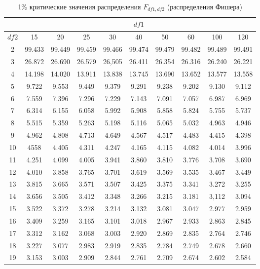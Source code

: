 \documentclass[12pt]{article}
\begin{document}
\begin{table}
\caption{1\% критические значения распределения $F_{df1,df2}$
(распределения Фишера) }
\begin{center}
{\footnotesize
\begin{tabular}{|c|c|c|c|c|c|c|c|c|c|}
	\hline
	& \multicolumn{9}{|c|}{$df1$} \\ \hline
	$df2$ & 15 & 20 & 25 & 30 & 40&  50&  60 & 100& 120\\ \hline  \hline
	2 & 99.433&99.449&99.459&99.466&99.474&99.479&99.482&99.489&99.491\\
	3 & 26.872&26.690&26.579&26,505&26.411&26.354&26.316&26.240&26.221\\
	4 & 14.198&14.020&13.911&13.838&13.745 &13.690&13.652&13.577&13.558\\
	5 & 9.722&9.553&9.449&9.379 &9.291 &9.238 &9.202&9.130&9.112\\
	6 & 7.559 &7.396&7.296&7.229&7.143&7.091&7.057&6.987&6.969\\
	7 & 6.314 &6.155&6.058&5.992&5.908&5.858&5.824&5.755&5.737\\
	8 & 5.515 &5.359&5.263&5.198&5.116&5.065&5.032&4.963&4.946\\
	9 & 4.962 &4.808&4.713&4.649&4.567&4.517&4.483&4.415&4.398\\
	10 & 4558 &4.405&4.311&4.247&4.165&4.115&4.082&4.014&3.996\\
	11 & 4.251 &4.099 &4.005 &3.941 &3.860 &3.810 &3.776 &3.708 &3.690\\
	12 & 4.010 &3.858 &3.765 &3.701 &3.619 &3.569 &3.535 &3.467 &3.449\\
	13 & 3.815 &3.665 &3.571 &3.507 &3.425 &3.375 &3.341 &3.272 &3.255\\
	14 & 3.656 &3.505 &3.412 &3.348 &3.266 &3.215 &3.181 &3,112 &3.094\\
	15 & 3.522 &3.372 &3.278 &3.214 &3.132 &3.081 &3.047 &2.977 &2.959\\
	16 & 3.409 &3.259 &3.165 &3.101 &3.018 &2.967 &2.933 &2.863 &2.845\\
	17 & 3.312 &3.162 &3.068 &3.003 &2.920 &2.869 &2.835 &2.764 &2.746\\
	18 & 3.227 &3.077 &2.983 &2.919 &2.835 &2.784 &2.749 &2.678 &2.660\\
	19 & 3.153 &3.003 &2.909 &2.844 &2.761 &2.709 &2.674 &2.602 &2.584\\

\end{tabular}}
\end{center}
\end{table}
\end{document}
